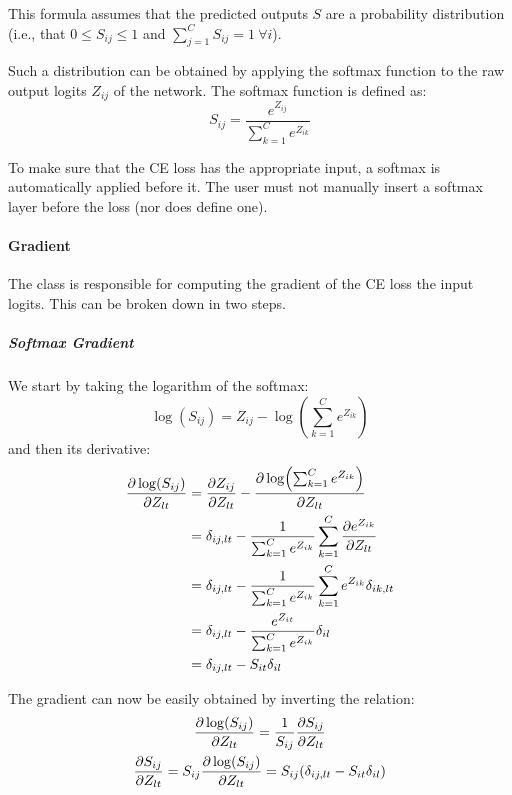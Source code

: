 This formula assumes that the predicted outputs $S$ are a probability distribution (i.e., that $0 \leq S_{ij} \leq 1$ and $\sum_{j=1}^{C} S_{ij} = 1\ \forall i$).

Such a distribution can be obtained by applying the softmax function to the raw output logits $Z_{ij}$ of the network. The softmax function is defined as:
\begin{equation}
    S_{ij} = \frac{e^{Z_{ij}}}{\sum_{k=1}^{C} e^{Z_{ik}}}
\end{equation}

To make sure that the \ac{CE} loss has the appropriate input, a softmax is automatically applied before it. The user must not manually insert a softmax layer before the loss (nor does \mfnet define one).

\paragraph{Gradient} The  class is responsible for computing the gradient of the \ac{CE} loss \wrt the input logits. This can be broken down in two steps.

\subparagraph{Softmax Gradient} We start by taking the logarithm of the softmax:
\begin{equation*}
    \log(S_{ij}) = Z_{ij} - \log(\sum_{k=1}^{C} e^{Z_{ik}})
\end{equation*}
and then its derivative:
\begin{equation} \label{eq:softmax_grad}
\begin{split}
    \pdv{\log(S_{ij})}{Z_{lt}} &= \pdv{Z_{ij}}{Z_{lt}} - \pdv{\log(\sum_{k=1}^{C} e^{Z_{ik}})}{Z_{lt}}\\
    &= \delta_{ij,lt} - \frac{1}{\sum_{k=1}^{C} e^{Z_{ik}}} \sum_{k=1}^{C} \pdv{e^{Z_{ik}}}{Z_{lt}}\\
    &= \delta_{ij,lt} - \frac{1}{\sum_{k=1}^{C} e^{Z_{ik}}} \sum_{k=1}^{C} e^{Z_{ik}} \delta_{ik,lt}\\
    &= \delta_{ij,lt} - \frac{e^{Z_{it}}}{\sum_{k=1}^{C} e^{Z_{ik}}} \delta_{il}\\
    &= \delta_{ij,lt} - S_{it} \delta_{il}
\end{split}
\end{equation}

The gradient can now be easily obtained by inverting the relation:
\begin{gather*}
    \pdv{\log(S_{ij})}{Z_{lt}} = \frac{1}{S_{ij}} \pdv{S_{ij}}{Z_{lt}}\nonumber\\
    \pdv{S_{ij}}{Z_{lt}} = S_{ij} \pdv{\log(S_{ij})}{Z_{lt}} = S_{ij} (\delta_{ij,lt} - S_{it} \delta_{il})
\end{gather*}

